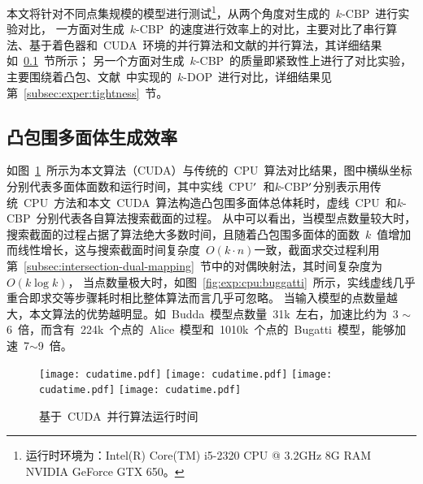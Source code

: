 本文将针对不同点集规模的模型进行测试\footnote{运行时环境为：Intel(R) Core(TM)
i5-2320 CPU @ 3.2GHz 8G RAM NVIDIA GeForce GTX
650。}，从两个角度对生成的~$k$-CBP~进行实验对比，
一方面对生成~$k$-CBP~的速度进行效率上的对比，主要对比了串行算法、基于着色器和~CUDA~环境的并行算法和文献的并行算法，其详细结果如~\ref{subsec:exper:efficiency}~节所示；
另一个方面对生成~$k$-CBP~的质量即紧致性上进行了对比实验，主要围绕着凸包、文献~中实现的~$k$-DOP~进行对比，详细结果见第~\ref{subsec:exper:tightness}~节。

\subsection{凸包围多面体生成效率}
\label{subsec:exper:efficiency}

如图~\ref{fig:chart:exps:cputime}~所示为本文算法（CUDA）与传统的~CPU~算法对比结果，图中横纵坐标分别代表多面体面数和运行时间，其中实线~CPU$\rm{'}$~和$k$-CBP$\rm{'}$分别表示用传统~CPU~方法和本文~CUDA~算法构造凸包围多面体总体耗时，虚线~CPU~和$k$-CBP~分别代表各自算法搜索截面的过程。
从中可以看出，当模型点数量较大时，搜索截面的过程占据了算法绝大多数时间，且随着凸包围多面体的面数~$k$~值增加而线性增长，这与搜索截面时间复杂度~$O(k\cdot
n)$一致，截面求交过程利用第~\ref{subsec:intersection-dual-mapping}~节中的对偶映射法，其时间复杂度为~$O(k\log k)$，
当点数量极大时，如图~\ref{fig:exp:cpu:buggatti}~所示，实线虚线几乎重合即求交等步骤耗时相比整体算法而言几乎可忽略。
当输入模型的点数量越大，本文算法的优势越明显。如~Budda~模型点数量~31k~左右，加速比约为~3 $\sim$ 6~倍，而含有~224k~个点的~Alice~模型和~1010k~个点的~Bugatti~模型，能够加速~7$\sim$9~倍。

\begin{figure}[htbp] %
\centering
{}
{  
   \texttt{[image: cudatime.pdf]}
}
{  
    \texttt{[image: cudatime.pdf]}
}\linebreak %
{  
   \texttt{[image: cudatime.pdf]}
}
{  
   \texttt{[image: cudatime.pdf]}
}
\caption{基于~CUDA~并行算法运行时间}
\label{fig:chart:exps:cputime}
\end{figure}


